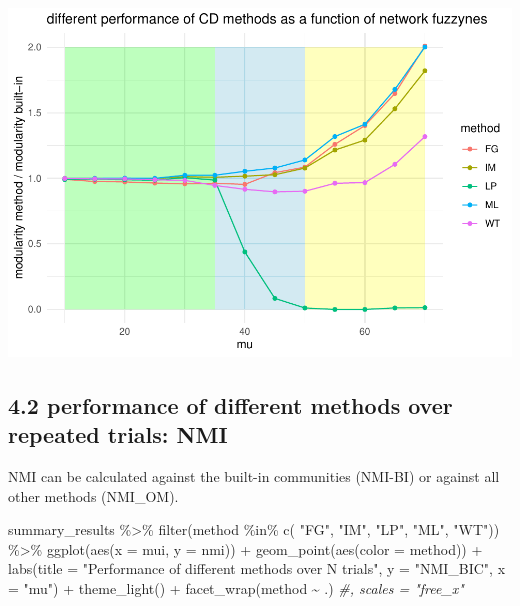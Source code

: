 \documentclass[
]{article}
\newenvironment{Shaded}{\begin{snugshade}}{\end{snugshade}}
\newcommand{\AttributeTok}[1]{\textcolor[rgb]{0.77,0.63,0.00}{#1}}
\newcommand{\CommentTok}[1]{\textcolor[rgb]{0.56,0.35,0.01}{\textit{#1}}}
\newcommand{\FunctionTok}[1]{\textcolor[rgb]{0.00,0.00,0.00}{#1}}
\newcommand{\NormalTok}[1]{#1}
\newcommand{\SpecialCharTok}[1]{\textcolor[rgb]{0.00,0.00,0.00}{#1}}
\newcommand{\StringTok}[1]{\textcolor[rgb]{0.31,0.60,0.02}{#1}}
\begin{document}
\includegraphics{com_det_algorithms_files/figure-latex/unnamed-chunk-11-1.pdf}

\hypertarget{performance-of-different-methods-over-repeated-trials-nmi}{%
\subsection{4.2 performance of different methods over repeated trials:
NMI}\label{performance-of-different-methods-over-repeated-trials-nmi}}

NMI can be calculated against the built-in communities (NMI-BI) or
against all other methods (NMI\_OM).

\begin{Shaded}
\begin{Highlighting}[]
\NormalTok{summary\_results }\SpecialCharTok{\%\textgreater{}\%} 
    \FunctionTok{filter}\NormalTok{(method }\SpecialCharTok{\%in\%} \FunctionTok{c}\NormalTok{( }\StringTok{"FG"}\NormalTok{, }\StringTok{"IM"}\NormalTok{, }\StringTok{"LP"}\NormalTok{, }\StringTok{"ML"}\NormalTok{, }\StringTok{"WT"}\NormalTok{)) }\SpecialCharTok{\%\textgreater{}\%}
  \FunctionTok{ggplot}\NormalTok{(}\FunctionTok{aes}\NormalTok{(}\AttributeTok{x =}\NormalTok{ mui, }\AttributeTok{y =}\NormalTok{ nmi)) }\SpecialCharTok{+}
    \FunctionTok{geom\_point}\NormalTok{(}\FunctionTok{aes}\NormalTok{(}\AttributeTok{color =}\NormalTok{ method)) }\SpecialCharTok{+}
    \FunctionTok{labs}\NormalTok{(}\AttributeTok{title =} \StringTok{"Performance of different methods over N trials"}\NormalTok{, }\AttributeTok{y =} \StringTok{"NMI\_BIC"}\NormalTok{, }\AttributeTok{x =} \StringTok{"mu"}\NormalTok{) }\SpecialCharTok{+}
    \FunctionTok{theme\_light}\NormalTok{()  }\SpecialCharTok{+} 
    \FunctionTok{facet\_wrap}\NormalTok{(method }\SpecialCharTok{\textasciitilde{}}\NormalTok{ .) }\CommentTok{\#,  scales = "free\_x"}
\end{Highlighting}
\end{Shaded}
\end{document}
